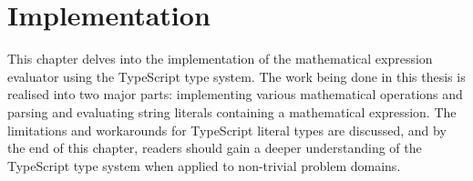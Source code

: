 \chapter{Implementation}

This chapter delves into the implementation of the mathematical expression evaluator using the TypeScript type system. The work being done in this thesis is realised into two major parts: implementing various mathematical operations and parsing and evaluating string literals containing a mathematical expression. The limitations and workarounds for TypeScript literal types are discussed, and by the end of this chapter, readers should gain a deeper understanding of the TypeScript type system when applied to non-trivial problem domains.





\clearpage











